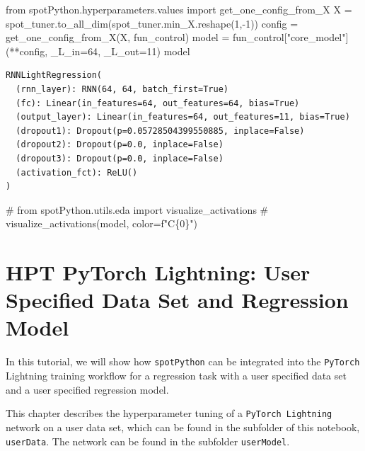 \documentclass[
  letterpaper,
  DIV=11,
  numbers=noendperiod]{scrreprt}
\newenvironment{Shaded}{\begin{snugshade}}{\end{snugshade}}
\newcommand{\CommentTok}[1]{\textcolor[rgb]{0.37,0.37,0.37}{#1}}
\newcommand{\DecValTok}[1]{\textcolor[rgb]{0.68,0.00,0.00}{#1}}
\newcommand{\ImportTok}[1]{\textcolor[rgb]{0.00,0.46,0.62}{#1}}
\newcommand{\NormalTok}[1]{\textcolor[rgb]{0.00,0.23,0.31}{#1}}
\newcommand{\OperatorTok}[1]{\textcolor[rgb]{0.37,0.37,0.37}{#1}}
\newcommand{\StringTok}[1]{\textcolor[rgb]{0.13,0.47,0.30}{#1}}
\begin{document}
\begin{Shaded}
\begin{Highlighting}[]
\ImportTok{from}\NormalTok{ spotPython.hyperparameters.values }\ImportTok{import}\NormalTok{ get\_one\_config\_from\_X}
\NormalTok{X }\OperatorTok{=}\NormalTok{ spot\_tuner.to\_all\_dim(spot\_tuner.min\_X.reshape(}\DecValTok{1}\NormalTok{,}\OperatorTok{{-}}\DecValTok{1}\NormalTok{))}
\NormalTok{config }\OperatorTok{=}\NormalTok{ get\_one\_config\_from\_X(X, fun\_control)}
\NormalTok{model }\OperatorTok{=}\NormalTok{ fun\_control[}\StringTok{"core\_model"}\NormalTok{](}\OperatorTok{**}\NormalTok{config, \_L\_in}\OperatorTok{=}\DecValTok{64}\NormalTok{, \_L\_out}\OperatorTok{=}\DecValTok{11}\NormalTok{)}
\NormalTok{model}
\end{Highlighting}
\end{Shaded}

\begin{verbatim}
RNNLightRegression(
  (rnn_layer): RNN(64, 64, batch_first=True)
  (fc): Linear(in_features=64, out_features=64, bias=True)
  (output_layer): Linear(in_features=64, out_features=11, bias=True)
  (dropout1): Dropout(p=0.05728504399550885, inplace=False)
  (dropout2): Dropout(p=0.0, inplace=False)
  (dropout3): Dropout(p=0.0, inplace=False)
  (activation_fct): ReLU()
)
\end{verbatim}

\begin{Shaded}
\begin{Highlighting}[]
\CommentTok{\# from spotPython.utils.eda import visualize\_activations}
\CommentTok{\# visualize\_activations(model, color=f"C\{0\}")}
\end{Highlighting}
\end{Shaded}

\chapter{HPT PyTorch Lightning: User Specified Data Set and Regression
Model}\label{hpt-pytorch-lightning-user-specified-data-set-and-regression-model}

In this tutorial, we will show how \texttt{spotPython} can be integrated
into the \texttt{PyTorch} Lightning training workflow for a regression
task with a user specified data set and a user specified regression
model.

This chapter describes the hyperparameter tuning of a
\texttt{PyTorch\ Lightning} network on a user data set, which can be
found in the subfolder of this notebook, \texttt{userData}. The network
can be found in the subfolder \texttt{userModel}.
\end{document}
